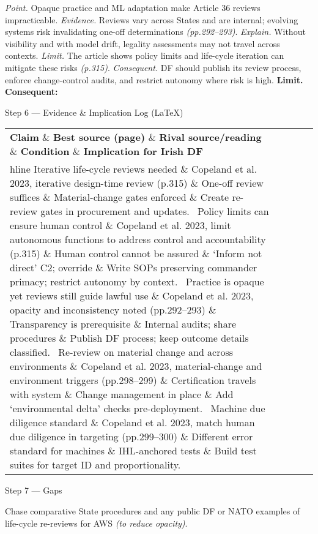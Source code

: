 \textit{Point.} Opaque practice and ML adaptation make Article 36 reviews impracticable.
\textit{Evidence.} Reviews vary across States and are internal; evolving systems risk invalidating one-off determinations \emph{(pp.292–293)}.
\textit{Explain.} Without visibility and with model drift, legality assessments may not travel across contexts.
\textit{Limit.} The article shows policy limits and life-cycle iteration can mitigate these risks \emph{(p.315)}.
\textit{Consequent.} DF should publish its review process, enforce change-control audits, and restrict autonomy where risk is high. \textbf{Limit. Consequent:}

Step 6 — Evidence \& Implication Log (LaTeX)

\begin{tabular}{p{3.2cm}p{4.2cm}p{3.6cm}p{3.2cm}p{4.2cm}}
	\textbf{Claim} \& \textbf{Best source (page)} \& \textbf{Rival source/reading} \& \textbf{Condition} \& \textbf{Implication for Irish DF}\\hline
	Iterative life-cycle reviews needed \& Copeland et al. 2023, iterative design-time review (p.315) \& One-off review suffices \& Material-change gates enforced \& Create re-review gates in procurement and updates. \
	Policy limits can ensure human control \& Copeland et al. 2023, limit autonomous functions to address control and accountability (p.315) \& Human control cannot be assured \& ‘Inform not direct’ C2; override \& Write SOPs preserving commander primacy; restrict autonomy by context. \
	Practice is opaque yet reviews still guide lawful use \& Copeland et al. 2023, opacity and inconsistency noted (pp.292–293) \& Transparency is prerequisite \& Internal audits; share procedures \& Publish DF process; keep outcome details classified. \
	Re-review on material change and across environments \& Copeland et al. 2023, material-change and environment triggers (pp.298–299) \& Certification travels with system \& Change management in place \& Add ‘environmental delta’ checks pre-deployment. \
	Machine due diligence standard \& Copeland et al. 2023, match human due diligence in targeting (pp.299–300) \& Different error standard for machines \& IHL-anchored tests \& Build test suites for target ID and proportionality. \
\end{tabular}

Step 7 — Gaps

Chase comparative State procedures and any public DF or NATO examples of life-cycle re-reviews for AWS \emph{(to reduce opacity)}.

